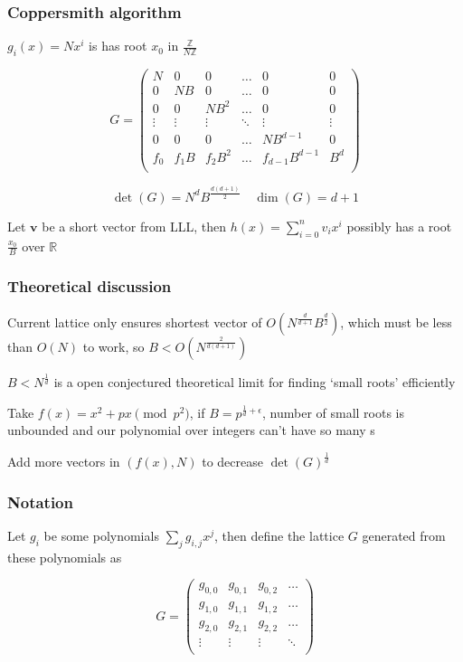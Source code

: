 \documentclass{beamer}
\begin{document}
\begin{frame}
    \frametitle{Coppersmith algorithm}
    $g_i(x)=Nx^i$ is has root $x_0$ in $\frac{\mathbb Z}{N\mathbb Z}$\break 

    $$G=\begin{pmatrix}
        N&0&0&\dots&0&0\\
        0&NB&0&\dots&0&0\\
        0&0&NB^2&\dots&0&0\\
        \vdots&\vdots&\vdots&\ddots&\vdots&\vdots\\
        0&0&0&\dots&NB^{d-1}&0\\
        f_0&f_1B&f_2B^2&\dots&f_{d-1}B^{d-1}&B^d\\
    \end{pmatrix}$$

    $$\det(G)=N^dB^{\frac{d(d+1)}2}\quad\dim(G)=d+1$$

    Let $\mathbf v$ be a short vector from LLL, then $h(x)=\sum_{i=0}^nv_ix^i$ possibly has a root $\frac{x_0}B$ over $\mathbb R$
\end{frame}

\begin{frame}
    \frametitle{Theoretical discussion}
    Current lattice only ensures shortest vector of $O\left(N^{\frac d{d+1}}B^{\frac d2}\right)$, which must be less than $O(N)$ to work, so $B<O\left(N^{\frac2{d(d+1)}}\right)$\break

    $B<N^{\frac1d}$ is a open conjectured theoretical limit for finding `small roots' efficiently

    Take $f(x)=x^2+px\pmod p^2$, if $B=p^{\frac 1d+\epsilon}$, number of small roots is unbounded and our polynomial over integers can't have so many s\break
    
    Add more vectors in $(f(x),N)$ to decrease $\det(G)^{\frac1d}$
\end{frame}

\begin{frame}
    \frametitle{Notation}
    Let $g_i$ be some polynomials $\sum_jg_{i,j}x^j$, then define the lattice $G$ generated from these polynomials as
    
    $$G=\begin{pmatrix}
        g_{0,0}&g_{0,1}&g_{0,2}&\dots\\
        g_{1,0}&g_{1,1}&g_{1,2}&\dots\\
        g_{2,0}&g_{2,1}&g_{2,2}&\dots\\
        \vdots&\vdots&\vdots&\ddots\\
    \end{pmatrix}$$
\end{frame}
\end{document}
